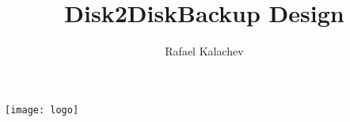\documentclass[12pt]{article}
\title{Disk2DiskBackup Design}
\author{Rafael Kalachev}
\begin{document}
\texttt{[image: logo]}
\end{document}
